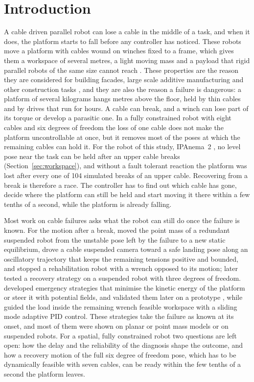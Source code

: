 \documentclass{interact}
\begin{document}
\section{Introduction}\label{sec:intro}

A cable driven parallel robot can lose a cable in the middle of a task, and when it does, the platform starts to fall before any controller has noticed. These robots move a platform with cables wound on winches fixed to a frame, which gives them a workspace of several metres, a light moving mass and a payload that rigid parallel robots of the same size cannot reach \citep{pott2018book,zarebidoki2022review,tachia2026review}. These properties are the reason they are considered for building facades, large scale additive manufacturing and other construction tasks \citep{izard2017printing}, and they are also the reason a failure is dangerous: a platform of several kilograms hangs metres above the floor, held by thin cables and by drives that run for hours. A cable can break, and a winch can lose part of its torque or develop a parasitic one. In a fully constrained robot with eight cables and six degrees of freedom the loss of one cable does not make the platform uncontrollable at once, but it removes most of the poses at which the remaining cables can hold it. For the robot of this study, IPAnema~2 \citep{pott2013ipanema}, no level pose near the task can be held after an upper cable breaks (Section~\ref{sec:workspace}), and without a fault tolerant reaction the platform was lost after every one of 104 simulated breaks of an upper cable. Recovering from a break is therefore a race. The controller has to find out which cable has gone, decide where the platform can still be held and start moving it there within a few tenths of a second, while the platform is already falling.

Most work on cable failures asks what the robot can still do once the failure is known. For the motion after a break, \citet{berti2016recovery} moved the point mass of a redundant suspended robot from the unstable pose left by the failure to a new static equilibrium, \citet{passarini2019camera} drove a cable suspended camera toward a safe landing pose along an oscillatory trajectory that keeps the remaining tensions positive and bounded, and \citet{boschetti2019rehab} stopped a rehabilitation robot with a wrench opposed to its motion; \citet{boschetti2021experimental} later tested a recovery strategy on a suspended robot with three degrees of freedom. \citet{boumann2019emergency} developed emergency strategies that minimise the kinetic energy of the platform or steer it with potential fields, and validated them later on a prototype \citep{boumann2023validation}, while \citet{dipaola2024smapid} guided the load inside the remaining wrench feasible workspace with a sliding mode adaptive PID control. These strategies take the failure as known at its onset, and most of them were shown on planar or point mass models or on suspended robots. For a spatial, fully constrained robot two questions are left open: how the delay and the reliability of the diagnosis shape the outcome, and how a recovery motion of the full six degree of freedom pose, which has to be dynamically feasible with seven cables, can be ready within the few tenths of a second the platform leaves.
\end{document}
